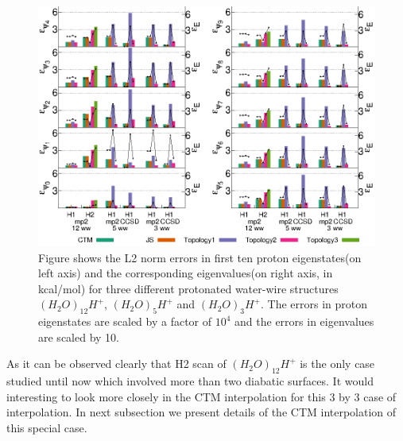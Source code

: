 
\begin{figure}[H]
  \begin{center}
    \includegraphics[width=1\textwidth]{figures/barsEditted.eps}
    \caption{\label{chap3fig9} Figure shows the L2 norm errors in first ten proton eigenstates(on left axis) and
    the corresponding eigenvalues(on right axis, in kcal/mol) for three different protonated water-wire structures
    $(H_{2}O)_{12}H^+$, $(H_{2}O)_5H^+$ and $(H_{2}O)_3H^+$. The errors in proton eigenstates are scaled by a
    factor of $10^4$ and the errors in eigenvalues are scaled by 10.}
  \end{center}
\end{figure}

As it can be observed clearly that H2 scan of $(H_{2}O)_{12}H^+$ is the only case studied until now which
involved more than two diabatic surfaces. It would interesting to look more closely in the CTM interpolation
for this 3 by 3 case of interpolation. In next subsection we present details of the CTM interpolation of
this special case.

